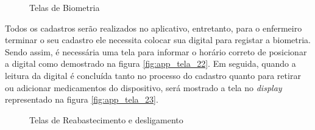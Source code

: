 \begin{apendicesenv}
\begin{figure}[H]
    \centering
    \caption{Telas de Biometria}\label{fig:telas_22_23}
\end{figure}
Todos os cadastros serão realizados no aplicativo, entretanto, para o enfermeiro terminar o seu cadastro ele necessita colocar sua digital para registar a biometria. Sendo assim, é necessária uma tela para informar o horário correto de posicionar a digital como demostrado na figura \ref{fig:app_tela_22}. Em seguida, quando a leitura da digital é concluída tanto no processo do cadastro quanto para retirar ou adicionar medicamentos do dispositivo, será mostrado a tela no \textit{display} representado na figura \ref{fig:app_tela_23}.


\begin{figure}[H]
    \centering
    \caption{Telas de Reabastecimento e desligamento }\label{fig:telas_21_25}
\end{figure}


\end{apendicesenv}
